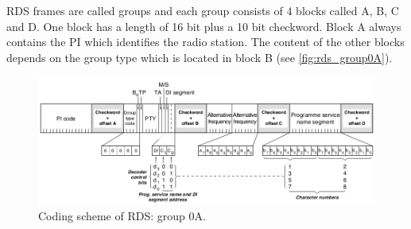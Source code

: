 RDS frames are called groups and each group consists of 4 blocks called
A, B, C and D. One block has a length of 16 bit plus a 10 bit checkword.
Block A always contains the \ac{PI} which identifies the radio station.
The content of the other blocks depends on the group type which is located
in block B (see \autoref{fig:rds_group0A}).

\begin{figure}
	\centering
	\includegraphics[width=1\linewidth]{gfx/rds/group0A.png}
	\caption{Coding scheme of RDS: group 0A. \cite{1999:iec62106}}
	\label{fig:rds_group0A}
\end{figure}

